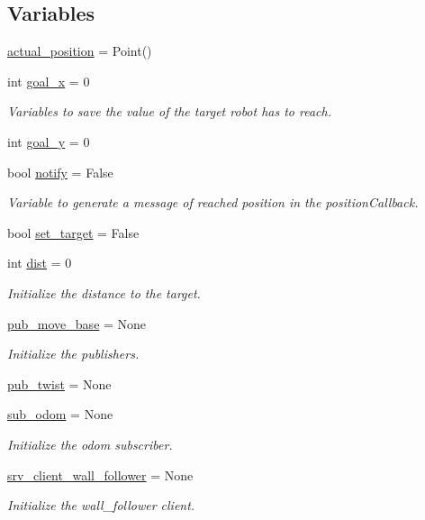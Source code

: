 \subsection*{Variables}
\begin{DoxyCompactItemize}
\item 
\hyperlink{namespacerobot__user__interface_a93557af62ae5a9f9fb406de12d599a58}{actual\+\_\+position} = Point()
\item 
int \hyperlink{namespacerobot__user__interface_aa49c4c4b4c031611deca926a34deb345}{goal\+\_\+x} = 0
\begin{DoxyCompactList}\small\item\em Variables to save the value of the target robot has to reach. \end{DoxyCompactList}\item 
int \hyperlink{namespacerobot__user__interface_aee93dc3e48f178d62b1209aa13232be2}{goal\+\_\+y} = 0
\item 
bool \hyperlink{namespacerobot__user__interface_ab96d4afbc6f7d4bb5019beec53e4615d}{notify} = False
\begin{DoxyCompactList}\small\item\em Variable to generate a message of reached position in the position\+Callback. \end{DoxyCompactList}\item 
bool \hyperlink{namespacerobot__user__interface_ab735683088fe7d67ce16d40c53b3208c}{set\+\_\+target} = False
\item 
int \hyperlink{namespacerobot__user__interface_a57ca0e32cc10313871da599206689de6}{dist} = 0
\begin{DoxyCompactList}\small\item\em Initialize the distance to the target. \end{DoxyCompactList}\item 
\hyperlink{namespacerobot__user__interface_ad8e7e9dc5f614912b17e97229d3bc726}{pub\+\_\+move\+\_\+base} = None
\begin{DoxyCompactList}\small\item\em Initialize the publishers. \end{DoxyCompactList}\item 
\hyperlink{namespacerobot__user__interface_aa95d3e42b12dbcb906f08ec10450e436}{pub\+\_\+twist} = None
\item 
\hyperlink{namespacerobot__user__interface_a18cc77d7f27b808397c9d58367a25280}{sub\+\_\+odom} = None
\begin{DoxyCompactList}\small\item\em Initialize the odom subscriber. \end{DoxyCompactList}\item 
\hyperlink{namespacerobot__user__interface_a95d6798bc3ba3f2e590443ca7ad8d7d4}{srv\+\_\+client\+\_\+wall\+\_\+follower} = None
\begin{DoxyCompactList}\small\item\em Initialize the wall\+\_\+follower client. \end{DoxyCompactList}\end{DoxyCompactItemize}


